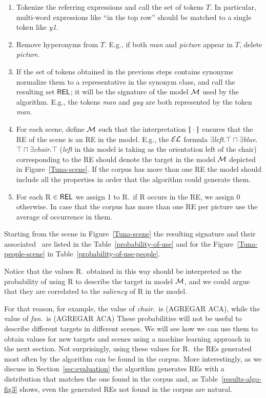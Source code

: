 \begin{enumerate}
\item Tokenize the referring expressions and call the set of tokens $T$. In particular, multi-word expressions like ``in the top row'' 
should be matched to a single token like \emph{y1}.

\item Remove hyperonyms from $T$. E.g., if both \emph{man} and \emph{picture} appear in $T$, delete \emph{picture}.

\item If the set of tokens obtained in the previous steps contains synonyms normalize them to a representative in the synonym class, 
and call the resulting set $\textsf{REL}$; it will be the signature of the model $\mathcal{M}$ used by the algorithm. E.g., the tokens \emph{man} 
and \emph{guy} are both represented by the token \emph{man}.

\item For each scene, define $\mathcal{M}$ such that the interpretation $|\!|\cdot|\!|$ ensures that the RE of the scene is an RE in the model.
 E.g., the $\mathcal{EL}$ formula $\exists$\emph{left}.$\top \sqcap \exists$\emph{blue}.$\top \sqcap \exists$\emph{chair}.$\top$ (\emph{left} in this model is taking as the orientation left of the chair) corresponding to the RE should denote the target in the model $\mathcal{M}$ depicted in Figure~\ref{Tuna-scene}. If the corpus has more than one RE the model should include all the properties in order that the algorithm could generate them.\\

\item For each R $\in \textsf{REL}$ we assign 1 to R.\puse\ if R occurs in the RE, we assign 0 otherwise. In case that the corpus has more than one RE per picture use the average of occurrence in them.

\end{enumerate}

Starting from the scene in Figure~\ref{Tuna-scene}
the resulting signature and their associated \puse\ are listed in the Table~\ref{probability-of-use} and for the Figure~\ref{Tuna-people-scene} in Table~\ref{probability-of-use-people}. 

Notice that the values R.\puse\ obtained in this way should be interpreted as the probability of using R to describe the target in model 
$\mathcal{M}$, and we could argue that they are correlated to the \emph{saliency} of R in the model.  

For that reason, for example, the value of \emph{chair}.\puse\ is (AGREGAR ACA), while the value of \emph{fan}.\puse\ is (AGREGAR ACA)  
These probabilities will not be useful to describe different targets in different scenes. We will see how we can use them to obtain
 values for new targets and scenes using a machine learning approach in the next section. Not surprisingly, using these values for 
R.\puse\ the REs generated most often by the algorithm can be found in the corpus. More interestingly, as we discuss in 
Section~\ref{sec:evaluation} the algorithm generates REs with a distribution that matches the one found in the corpus and, 
as Table~\ref{results-algo-fig3} shows, even the generated REs not found in the corpus are natural.    



